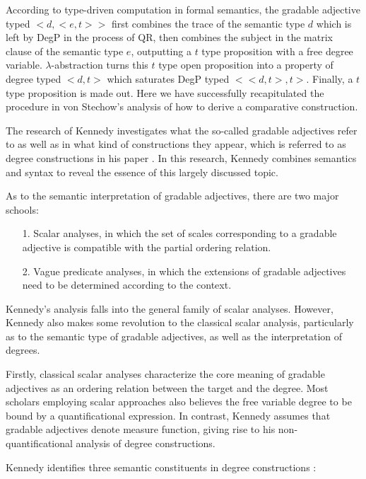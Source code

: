 \documentclass{ctexart}
\let \cite \parencite
\begin{document}
According to type-driven computation in formal semantics, the gradable adjective typed $<d,<e,t>>$ first combines the trace of the semantic type $d$ which is left by DegP in the process of QR, then combines the subject in the matrix clause of the semantic type $e$, outputting a $t$ type proposition with a free degree variable. $\lambda$-abstraction turns this $t$ type open proposition into a property of degree typed $<d,t>$ which saturates DegP typed $<<d,t>,t>$. Finally, a $t$ type proposition is made out. Here we have successfully recapitulated the procedure in von Stechow’s analysis of how to derive a comparative construction.

The research of Kennedy investigates what the so-called gradable adjectives refer to as well as in what kind of constructions they appear, which is referred to as degree constructions in his paper \cite{kennedy1997}. In this research, Kennedy combines semantics and syntax to reveal the essence of this largely discussed topic.

As to the semantic interpretation of gradable adjectives, there are two major schools:

\begin{itemize}
    \item[1.] Scalar analyses, in which the set of scales corresponding to a gradable adjective is compatible with the partial ordering relation\cite{cresswell1976,bierwisch1989}.
    \item[2.] Vague predicate analyses, in which the extensions of gradable adjectives need to be determined according to the context\cite{ginet1973,kamp2013,klein1980}. 
\end{itemize}

\noindent
Kennedy’s analysis falls into the general family of scalar analyses. However, Kennedy also makes some revolution to the classical scalar analysis, particularly as to the semantic type of gradable adjectives, as well as the interpretation of degrees.

Firstly, classical scalar analyses characterize the core meaning of gradable adjectives as an ordering relation between the target and the degree. Most scholars employing scalar approaches also believes the free variable degree to be bound by a quantificational expression\cite{hellan1981,hoeksema1983,von1984a}. In contrast, Kennedy assumes that gradable adjectives denote measure function, giving rise to his non-quantificational analysis of degree constructions.

Kennedy identifies three semantic constituents in degree constructions \cite{russell1905}: 
\end{document}
